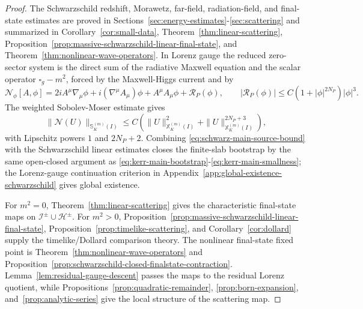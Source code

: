 \documentclass[11pt]{article}
\numberwithin{equation}{section}
\theoremstyle{plain}
\theoremstyle{definition}
\theoremstyle{remark}
\begin{document}
\begin{proof}
The Schwarzschild redshift, Morawetz, far-field, radiation-field, and final-state estimates are proved in Sections~\ref{sec:energy-estimates}-\ref{sec:scattering} and summarized in Corollary~\ref{cor:small-data}, Theorem~\ref{thm:linear-scattering}, Proposition~\ref{prop:massive-schwarzschild-linear-final-state}, and Theorem~\ref{thm:nonlinear-wave-operators}.  In Lorenz gauge the reduced zero-sector system is the direct sum of the radiative Maxwell equation and the scalar operator \(\square_g-m^2\), forced by the Maxwell-Higgs current and by
\begin{equation}\label{eq:thmC-source-bound}
 \mathcal N_\phi[A,\phi]=2iA^\mu\nabla_\mu\phi+i(\nabla^\mu A_\mu)\phi+A^\mu A_\mu\phi+
 \mathcal R_P(\phi),
 \qquad
 |\mathcal R_P(\phi)|\le C(1+|\phi|^{2N_P})|\phi|^3.
\end{equation}
The weighted Sobolev-Moser estimate gives
\begin{equation}\label{eq:schwarz-main-source-bound}
 \|\mathcal N(U)\|_{\mathbb S_K^{(m)}(I)}
 \le C\left(\|U\|_{\mathbb X_K^{(m)}(I)}^2+
          \|U\|_{\mathbb X_K^{(m)}(I)}^{2N_P+3}\right),
\end{equation}
with Lipschitz powers \(1\) and \(2N_P+2\).  Combining \eqref{eq:schwarz-main-source-bound} with the Schwarzschild linear estimates closes the finite-slab bootstrap by the same open-closed argument as \eqref{eq:kerr-main-bootstrap}-\eqref{eq:kerr-main-smallness}; the Lorenz-gauge continuation criterion in Appendix~\ref{app:global-existence-schwarzschild} gives global existence.

For \(m^2=0\), Theorem~\ref{thm:linear-scattering} gives the characteristic final-state maps on \(\mathcal I^\pm\cup\mathcal H^\pm\).  For \(m^2>0\), Proposition~\ref{prop:massive-schwarzschild-linear-final-state}, Proposition~\ref{prop:timelike-scattering}, and Corollary~\ref{cor:dollard} supply the timelike/Dollard comparison theory.  The nonlinear final-state fixed point is Theorem~\ref{thm:nonlinear-wave-operators} and Proposition~\ref{prop:schwarzschild-closed-finalstate-contraction}.  Lemma~\ref{lem:residual-gauge-descent} passes the maps to the residual Lorenz quotient, while Propositions~\ref{prop:quadratic-remainder}, \ref{prop:born-expansion}, and~\ref{prop:analytic-series} give the local structure of the scattering map.
\end{proof}
\end{document}
